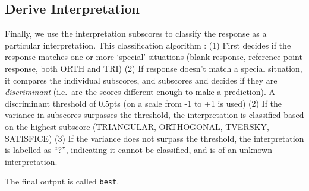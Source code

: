 \documentclass[
  letterpaper,
  DIV=11,
  numbers=noendperiod]{scrreprt}
\begin{document}
\hypertarget{sec-SGC3A-interpretation}{%
\subsection{Derive Interpretation}\label{sec-SGC3A-interpretation}}

Finally, we use the interpretation subscores to classify the response as
a particular interpretation. This classification algorithm : (1) First
decides if the response matches one or more `special' situations (blank
response, reference point response, both ORTH and TRI) (2) If response
doesn't match a special situation, it compares the individual subscores,
and subscores and decides if they are \emph{discriminant} (i.e.~are the
scores different enough to make a prediction). A discriminant threshold
of 0.5pts (on a scale from -1 to +1 is used) (2) If the variance in
subscores surpasses the threshold, the interpretation is classified
based on the highest subscore (TRIANGULAR, ORTHOGONAL, TVERSKY,
SATISFICE) (3) If the variance does not surpass the threshold, the
interpretation is labelled as ``?'', indicating it cannot be classified,
and is of an unknown interpretation.

The final output is called \texttt{best}.
\end{document}
